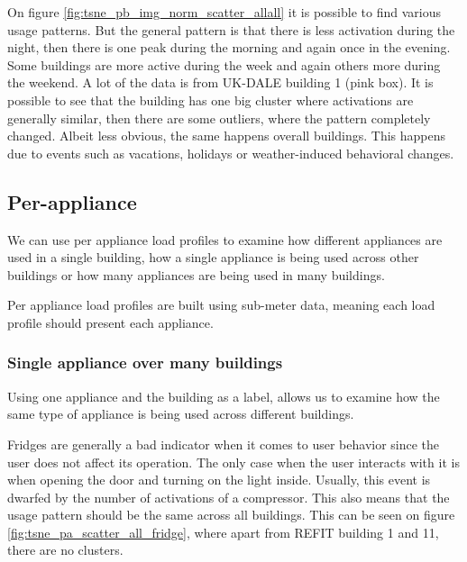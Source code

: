 On figure \ref{fig:tsne_pb_img_norm_scatter_allall} it is possible to find various usage patterns. 
But the general pattern is that there is less activation during the night, then there is one peak during the morning and again once in the evening.
Some buildings are more active during the week and again others more during the weekend.
A lot of the data is from UK-DALE building 1 (pink box). 
It is possible to see that the building has one big cluster where activations are generally similar, then there are some outliers,
where the pattern completely changed. 
Albeit less obvious, the same happens overall buildings.
This happens due to events such as vacations, holidays or weather-induced behavioral changes.

\subsection{Per-appliance}

We can use per appliance load profiles to examine how different appliances 
are used in a single building, how a single appliance is being used across other buildings
or how many appliances are being used in many buildings.

Per appliance load profiles are built using sub-meter data,
meaning each load profile should present each appliance.

\subsubsection{Single appliance over many buildings}

Using one appliance and the building as a label,
allows us to examine how the same type of appliance is being used across different buildings.

Fridges are generally a bad indicator when it comes to user behavior since the user does not affect its operation. 
The only case when the user interacts with it is when opening the door and turning on the light inside. 
Usually, this event is dwarfed by the number of activations of a compressor. 
This also means that the usage pattern should be the same across all buildings. 
This can be seen on figure \ref{fig:tsne_pa_scatter_all_fridge}, 
where apart from REFIT building 1 and 11, there are no clusters.

